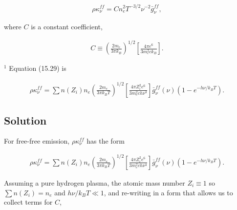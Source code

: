 \documentclass[12pt]{article}
\begin{document}
\begin{align*}
\rho\kappa_\nu^{ff} =Cn_e^2T^{-3/2}\nu^{-2}\bar{g}_\nu^{ff},
\end{align*}

{\noindent}where $C$ is a constant coefficient,

\begin{align*}
C \equiv \left(\frac{2m_e}{3\pi k_B}\right)^{1/2}\left[\frac{4\pi e^6}{3m_e^2 c k_B}\right].
\end{align*}

$^1$ Equation (15.29) is 

\begin{align*}
\rho\kappa_\nu^{ff} = \sum n(Z_i)n_e\left(\frac{2m_e}{3\pi k_BT}\right)^{1/2}\left[\frac{4\pi Z_i^2e^6}{3m_e^2ch\nu^3}\right]\bar{g}_\nu^{ff}(\nu)\left(1-e^{-h\nu/k_BT}\right).
\end{align*}


\subsection*{Solution}

For free-free emission, $\rho\kappa_\nu^{ff}$ has the form

\begin{align*}
    \rho\kappa_\nu^{ff} = \sum n(Z_i)n_e\left(\frac{2m_e}{3\pi k_BT}\right)^{1/2}\left[\frac{4\pi Z_i^2e^6}{3m_e^2ch\nu^3}\right]\bar{g}_\nu^{ff}(\nu)\left(1-e^{-h\nu/k_BT}\right).
\end{align*}

{\noindent}Assuming a pure hydrogen plasma, the atomic mass number $Z_i\equiv1$ so $\sum n(Z_i)=n_e$ and $h\nu/k_BT\ll1$, and re-writing in a form that allows us to collect terms for $C$,
\end{document}
